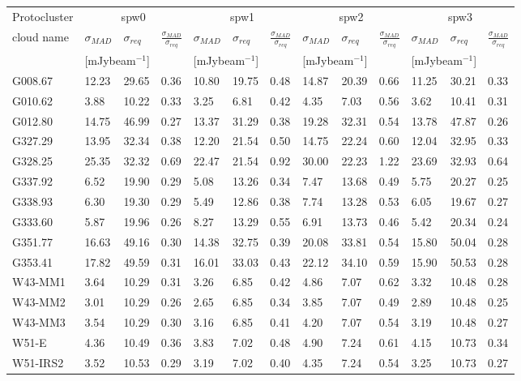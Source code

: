 \documentclass[longauth]{aa} %
\newcommand{\tdust}{\mbox{$T_{\rm dust}$}}
\newcommand{\lbol}{\ensuremath{L_{\mathrm{bol}}\xspace}}        %
\begin{document}
\begin{appendix}
\begin{table}[htbp!]
\begin{tabular}{@{\extracolsep{4pt}}lllllllllllll@{}}
\hline \noalign {\smallskip}
Protocluster  & \multicolumn{3}{c}{spw0}  & \multicolumn{3}{c}{spw1}  & \multicolumn{3}{c}{spw2}
    & \multicolumn{3}{c}{spw3} \\ %
\cline{2-4}\cline{5-7}\cline{8-10}\cline{11-13}
cloud name\tnote{1}  & $\sigma_{MAD}$ & $\sigma_{req}$ & $\frac{\sigma_{MAD}}{\sigma_{req}}$  & $\sigma_{MAD}$ & $\sigma_{req}$ & $\frac{\sigma_{MAD}}{\sigma_{req}}$  & $\sigma_{MAD}$ & $\sigma_{req}$ & $\frac{\sigma_{MAD}}{\sigma_{req}}$  & $\sigma_{MAD}$ & $\sigma_{req}$ & $\frac{\sigma_{MAD}}{\sigma_{req}}$\\
& \multicolumn{2}{c}{[mJybeam$^{-1}$]}& & \multicolumn{2}{c}{[mJybeam$^{-1}$]}& &  \multicolumn{2}{c}{[mJybeam$^{-1}$]}& & \multicolumn{2}{c}{[mJybeam$^{-1}$]}\\
\hline \noalign {\smallskip}
G008.67  &  12.23 & 29.65 & 0.36 & 10.80 & 19.75 & 0.48 & 14.87 & 20.39 & 0.66 & 11.25 & 30.21 & 0.33 \\
G010.62  &  3.88 & 10.22 & 0.33 & 3.25 & 6.81 & 0.42 & 4.35 & 7.03 & 0.56 & 3.62 & 10.41 & 0.31 \\
G012.80  &  14.75 & 46.99 & 0.27 & 13.37 & 31.29 & 0.38 & 19.28 & 32.31 & 0.54 & 13.78 & 47.87 & 0.26 \\
G327.29  &  13.95 & 32.34 & 0.38 & 12.20 & 21.54 & 0.50 & 14.75 & 22.24 & 0.60 & 12.04 & 32.95 & 0.33 \\
G328.25  &  25.35 & 32.32 & 0.69 & 22.47 & 21.54 & 0.92 & 30.00 & 22.23 & 1.22 & 23.69 & 32.93 & 0.64 \\
G337.92  &  6.52 & 19.90 & 0.29 & 5.08 & 13.26 & 0.34 & 7.47 & 13.68 & 0.49 & 5.75 & 20.27 & 0.25 \\
G338.93  &  6.30 & 19.30 & 0.29 & 5.49 & 12.86 & 0.38 & 7.74 & 13.28 & 0.53 & 6.05 & 19.67 & 0.27 \\
G333.60  &  5.87 & 19.96 & 0.26 & 8.27 & 13.29 & 0.55 & 6.91 & 13.73 & 0.46 & 5.42 & 20.34 & 0.24 \\
G351.77  &  16.63 & 49.16 & 0.30 & 14.38 & 32.75 & 0.39 & 20.08 & 33.81 & 0.54 & 15.80 & 50.04 & 0.28 \\
G353.41  &  17.82 & 49.59 & 0.31 & 16.01 & 33.03 & 0.43 & 22.12 & 34.10 & 0.59 & 15.90 & 50.53 & 0.28 \\
W43-MM1  &  3.64 & 10.29 & 0.31 & 3.26 & 6.85 & 0.42 & 4.86 & 7.07 & 0.62 & 3.32 & 10.48 & 0.28 \\
W43-MM2  &  3.01 & 10.29 & 0.26 & 2.65 & 6.85 & 0.34 & 3.85 & 7.07 & 0.49 & 2.89 & 10.48 & 0.25 \\
W43-MM3  &  3.54 & 10.29 & 0.30 & 3.16 & 6.85 & 0.41 & 4.20 & 7.07 & 0.54 & 3.19 & 10.48 & 0.27 \\
W51-E  &  4.36 & 10.49 & 0.36 & 3.83 & 7.02 & 0.48 & 4.90 & 7.24 & 0.61 & 4.15 & 10.73 & 0.34 \\
W51-IRS2  &  3.52 & 10.53 & 0.29 & 3.19 & 7.02 & 0.40 & 4.35 & 7.24 & 0.54 & 3.25 & 10.73 & 0.27 \\



\end{tabular}
\end{table}
\end{appendix}
\end{document}
